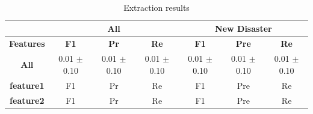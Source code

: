 \documentclass{article}
\begin{document}
\begin{table}[t]
\centering
\begin{tabular}{|c|c|c|c|c|c|c|}
\hline
               & \multicolumn{3}{c|}{All} &                       \multicolumn{3}{c|}{New Disaster}  \\
\hline
{\bf Features} &  {\bf F1}        &  {\bf Pr}  &  {\bf Re} & {\bf F1}  &  {\bf Pre}  &  {\bf Re}\\
\hline
{\bf All}      &  0.01 $\pm$ 0.10 & 0.01 $\pm$ 0.10 & 0.01 $\pm$ 0.10 & 0.01 $\pm$ 0.10 & 0.01 $\pm$ 0.10 & 0.01 $\pm$ 0.10\\
{\bf feature1} &       F1         &       Pr        &       Re        &      F1         &       Pre       &       Re \\
{\bf feature2} &       F1         &       Pr        &       Re        &      F1         &       Pre       &       Re \\
\hline
\end{tabular}
\caption{Extraction results\label{tab.extraction_results}}
\end{table}
\end{document}
